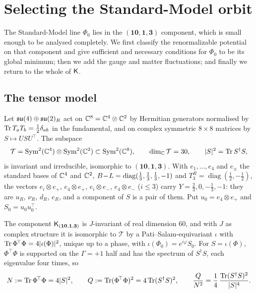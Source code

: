 \section{Selecting the Standard-Model orbit}
\label{sec:selection}

The Standard-Model line $\Phi_0$ lies in the $(\mathbf{10},\mathbf1,\mathbf3)$ component, which is small enough to be analysed completely. We first classify
the renormalizable potential on that component and give sufficient and necessary conditions for $\Phi_0$ to be its global minimum; then we add the gauge
and matter fluctuations;
and finally we return to the whole of $\mathsf K$.

\subsection{The tensor model}

Let $\mathfrak{su}(4)\oplus\mathfrak{su}(2)_R$ act on $\mathbb{C}^8=\mathbb{C}^4\otimes\mathbb{C}^2$ by Hermitian generators normalised by $\operatorname{Tr} T_aT_b=\tfrac12\delta_{ab}$ in the fundamental, and on complex
symmetric $8\times8$ matrices by $S\mapsto USU^{\!\top}$. The subspace
\[
\mathcal T=\mathrm{Sym}^2(\mathbb{C}^4)\otimes\mathrm{Sym}^2(\mathbb{C}^2)\subset\mathrm{Sym}^2(\mathbb{C}^8),\qquad \dim_{\mathbb{C}}\mathcal T=30,\qquad |S|^2=\operatorname{Tr} S^\dagger S,
\]
is invariant and irreducible, isomorphic to $(\mathbf{10},\mathbf1,\mathbf3)$. With $e_1,\dots,e_4$ and $e_\pm$ the standard bases of $\mathbb{C}^4$ and $\mathbb{C}^2$, $B\!-\!L=\operatorname{diag}(\tfrac13,\tfrac13,\tfrac13,-1)$
and $T^R_3=\operatorname{diag}(\tfrac12,-\tfrac12)$, the vectors $e_i\otimes e_+$, $e_4\otimes e_+$, $e_i\otimes e_-$, $e_4\otimes e_-$ ($i\le3$) carry $Y=\tfrac23,0,-\tfrac13,-1$:
they are $u_R$, $\nu_R$, $d_R$, $e_R$, and a component of $S$ is a pair of them. Put $u_0=e_4\otimes e_+$ and $S_0=u_0u_0^{\!\top}$.

\begin{proposition}
\label{prop:tensor}
The component $\mathsf K_{(\mathbf{10},\mathbf1,\mathbf3)}$ is $J$-invariant of real dimension $60$, and with $J$ as complex structure it is isomorphic to $\mathcal T$ by a
Pati--Salam-equivariant $\iota$ with $\operatorname{Tr}\Phi^{\!\top}\Phi=4|\iota(\Phi)|^2$, unique up to a phase, with $\iota(\Phi_0)=e^{i\varphi}S_0$. For
$S=\iota(\Phi)$, $\Phi^{\!\top}\Phi$ is supported on the $\Gamma=+1$ half and has the spectrum of $S^\dagger S$, each eigenvalue four times, so
\[
N:=\operatorname{Tr}\Phi^{\!\top}\Phi=4|S|^2,\qquad Q:=\operatorname{Tr}(\Phi^{\!\top}\Phi)^2=4\operatorname{Tr}(S^\dagger S)^2,\qquad \frac Q{N^2}=\frac14\,\frac{\operatorname{Tr}(S^\dagger S)^2}{|S|^4}.
\]
\end{proposition}

